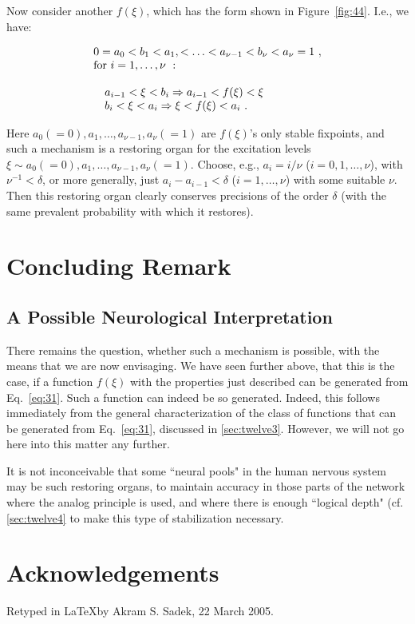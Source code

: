 \documentclass[twocolumn,preprintnumbers,amsmath,amssymb,floatfix]{revtex4}
\begin{document}
Now consider another $f(\xi)$, which has the form shown in
Figure~\ref{fig:44}. I.e., we have:

\begin{eqnarray*}
\begin{array}{l}
0=a_0<b_1<a_1,<\ldots<a_{\nu-1}<b_\nu<a_\nu=1~,\\
$for$~i=1,\ldots,\nu~:\\\\
~~~a_{i-1}<\xi<b_i \Rightarrow a_{i-1}<f(\xi)<\xi\\
~~~b_i<\xi<a_i \Rightarrow \xi<f(\xi)<a_i~.
\end{array}
\end{eqnarray*}

\noindent Here $a_0(=0),a_1,\ldots,a_{\nu-1},a_\nu(=1)$ are
$f(\xi)$'s only stable fixpoints, and such a mechanism is a
restoring organ for the excitation levels $\xi\sim
a_0(=0),a_1,\ldots,a_{\nu-1},a_\nu(=1)$. Choose, e.g., $a_i=i/\nu$
($i=0,1,\ldots,\nu$), with $\nu^{-1}<\delta$, or more generally,
just $a_i-a_{i-1}<\delta$ ($i=1,\ldots,\nu$) with some suitable
$\nu$. Then this restoring organ clearly conserves precisions of
the order $\delta$ (with the same prevalent probability with which
it restores).

\section{\label{sec:thirteen}Concluding Remark}

\subsection{\label{sec:thirteen1}A Possible Neurological Interpretation}

There remains the question, whether such a mechanism is possible,
with the means that we are now envisaging. We have seen further
above, that this is the case, if a function $f(\xi)$ with the
properties just described can be generated from Eq.~\ref{eq:31}.
Such a function can indeed be so generated. Indeed, this follows
immediately from the general characterization of the class of
functions that can be generated from Eq.~\ref{eq:31}, discussed in
\ref{sec:twelve3}. However, we will not go here into this matter
any further.

It is not inconceivable that some ``neural pools" in the human
nervous system may be such restoring organs, to maintain accuracy
in those parts of the network where the analog principle is used,
and where there is enough ``logical depth" (cf. \ref{sec:twelve4}
to make this type of stabilization necessary.

\section{Acknowledgements}

Retyped in \LaTeX by Akram S. Sadek, 22 March 2005.


\end{document}
